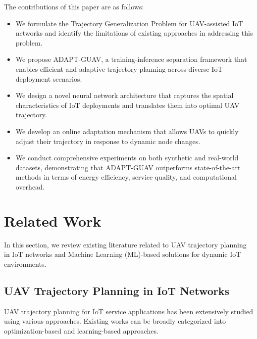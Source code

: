 \documentclass[10pt,conference,letterpaper]{IEEEtran}
\begin{document}
The contributions of this paper are as follows:

\begin{itemize}
    \item We formulate the Trajectory Generalization Problem for UAV-assisted IoT networks and identify the limitations of existing approaches in addressing this problem.
    \item We propose ADAPT-GUAV, a training-inference separation framework that enables efficient and adaptive trajectory planning across diverse IoT deployment scenarios.
    \item We design a novel neural network architecture that captures the spatial characteristics of IoT deployments and translates them into optimal UAV trajectory.
    \item We develop an online adaptation mechanism that allows UAVs to quickly adjust their trajectory in response to dynamic node changes.
    \item We conduct comprehensive experiments on both synthetic and real-world datasets, demonstrating that ADAPT-GUAV outperforms state-of-the-art methods in terms of energy efficiency, service quality, and computational overhead.

\end{itemize}




\section{Related Work} 
\label{sec:related_work}

In this section, we review existing literature related to UAV trajectory planning in IoT networks and Machine Learning (ML)-based solutions for dynamic IoT environments.

\subsection{UAV Trajectory Planning in IoT Networks}


UAV trajectory planning for IoT service applications has been extensively studied using various approaches. Existing works can be broadly categorized into optimization-based and learning-based approaches.
\end{document}
